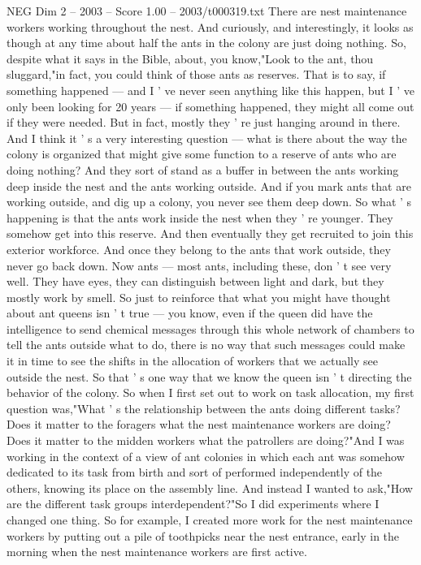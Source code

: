 \begin{textsample}{NEG Dim 2 – 2003 – Score 1.00 – 2003/t000319.txt}
There are nest maintenance workers working throughout the nest.
And curiously, and interestingly, it looks as though at any time about half the ants in the colony are just doing nothing.
So, despite what it says in the Bible, about, you know,"Look to the ant, thou sluggard,"in fact, you could think of those ants as reserves.
That is to say, if something happened — and I ' ve never seen anything like this happen, but I ' ve only been looking for 20 years — if something happened, they might all come out if they were needed.
But in fact, mostly they ' re just hanging around in there.
And I think it ' s a very interesting question — what is there about the way the colony is organized that might give some function to a reserve of ants who are doing nothing?
And they sort of stand as a buffer in between the ants working deep inside the nest and the ants working outside.
And if you mark ants that are working outside, and dig up a colony, you never see them deep down.
So what ' s happening is that the ants work inside the nest when they ' re younger.
They somehow get into this reserve.
And then eventually they get recruited to join this exterior workforce.
And once they belong to the ants that work outside, they never go back down.
Now ants — most ants, including these, don ' t see very well.
They have eyes, they can distinguish between light and dark, but they mostly work by smell.
So just to reinforce that what you might have thought about ant queens isn ' t true — you know, even if the queen did have the intelligence to send chemical messages through this whole network of chambers to tell the ants outside what to do, there is no way that such messages could make it in time to see the shifts in the allocation of workers that we actually see outside the nest.
So that ' s one way that we know the queen isn ' t directing the behavior of the colony.
So when I first set out to work on task allocation, my first question was,"What ' s the relationship between the ants doing different tasks?
Does it matter to the foragers what the nest maintenance workers are doing?
Does it matter to the midden workers what the patrollers are doing?"And I was working in the context of a view of ant colonies in which each ant was somehow dedicated to its task from birth and sort of performed independently of the others, knowing its place on the assembly line.
And instead I wanted to ask,"How are the different task groups interdependent?"So I did experiments where I changed one thing.
So for example, I created more work for the nest maintenance workers by putting out a pile of toothpicks near the nest entrance, early in the morning when the nest maintenance workers are first active.

\end{textsample}
